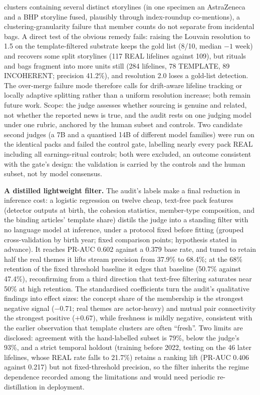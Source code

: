\documentclass[a4paper,12pt]{report}
\begin{document}
clusters containing several distinct storylines (in one specimen an
AstraZeneca and a BHP storyline fused, plausibly through index-roundup
co-mentions), a clustering-granularity failure that member counts do not
separate from incidental bags. A direct test of the obvious remedy fails:
raising the Louvain resolution to 1.5 on the template-filtered substrate
keeps the gold list (8/10, median $-1$ week) and recovers some split
storylines (117 REAL lifelines against 109), but rituals and bags fragment
into more units still (284 lifelines, 78 TEMPLATE, 89 INCOHERENT; precision
41.2\%), and resolution 2.0 loses a gold-list detection. The over-merge
failure mode therefore calls for drift-aware lifeline tracking or locally
adaptive splitting rather than a uniform resolution increase; both remain
future work. Scope: the judge assesses whether sourcing is
genuine and related, not whether the reported news is true, and the audit
rests on one judging model under one rubric, anchored by the human subset
and controls. Two candidate second judges (a 7B and a quantised 14B of
different model families) were run on the identical packs and failed
the control gate, labelling nearly every pack REAL including all
earnings-ritual controls; both were excluded, an outcome consistent
with the gate's design: the validation is carried by the controls and the human subset,
not by model consensus.

\textbf{A distilled lightweight filter.} The audit's labels make a final
reduction in inference cost: a logistic regression on twelve cheap, text-free pack
features (detector outputs at birth, the cohesion statistics, member-type
composition, and the binding articles' template share) distils the judge
into a standing filter with no language model at inference, under a
protocol fixed before fitting (grouped cross-validation by birth year;
fixed comparison points; hypothesis stated in advance). It reaches PR-AUC
0.602 against a 0.379 base rate, and tuned to retain half the real themes
it lifts stream precision from 37.9\% to 68.4\%; at the 68\% retention of
the fixed threshold baseline it edges that baseline (50.7\% against
47.4\%), reconfirming from a third direction that text-free filtering
saturates near 50\% at high retention. The standardised coefficients turn
the audit's qualitative findings into effect sizes: the concept share of
the membership is the strongest negative signal ($-0.71$; real themes are
actor-heavy) and mutual pair connectivity the strongest positive ($+0.67$),
while freshness is mildly negative, consistent with the earlier observation
that template clusters are often ``fresh''. Two limits are disclosed:
agreement with the hand-labelled subset is 79\%, below the judge's 93\%,
and a strict temporal holdout (training before 2022, testing on the 46
later lifelines, whose REAL rate falls to 21.7\%) retains a ranking lift
(PR-AUC 0.406 against 0.217) but not fixed-threshold precision, so the
filter inherits the regime dependence recorded among the limitations and
would need periodic re-distillation in deployment.
\end{document}
